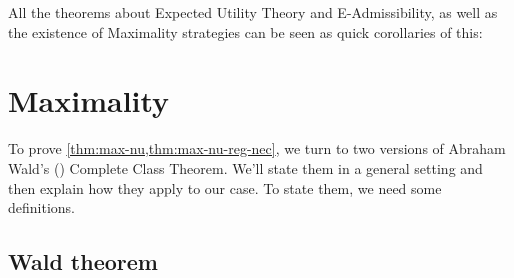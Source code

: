 \documentclass[a4paper]{article}
\newcommand\D{\mathcal{D}}
\newcommand\Exp{\mathsf{Exp}}
\newcommand\EU{\mathrm{EU}}
\newcommand\U{\mathfrak{U}} %
\newcommand{\pb}{b}
\newcommand\SetDelimiter[1][]{
	\nonscript\,#1\vert \allowbreak \nonscript\,\mathopen{}}
\providecommand\given{\SetDelimiter}
\renewcommand{\leq}{\leqslant}
\newenvironment{CCM rewritten}
{\begingroup\color{blue}} %
{\endgroup}              %
\begin{document}
All the theorems about Expected Utility Theory and E-Admissibility, as well as the existence of Maximality strategies can be seen as quick corollaries of this: 

\begin{comment}
	
In fact, we can create a version of this result allowing dependence between the decision problem you're faced with and the state of the world, assuming that when you make a decision you first conditionalise your probabilities on which decision problem you're faced with and then use expected utility using that updated probability to make the decision. 
This is because $\Exp_\pb[\U(\nu)]=\Exp_{\pb_\D}\Exp_{\pb(\cdot|D)}\U(\nu)$, where $\pb_\D$ is the marginal. Each $\Exp_{\pb(\cdot|D)}\U(\nu)$ is maximised when $\nu_D(\EU_{\pb(\cdot|D)}(D))=1$, at least, whenever this is well-defined. So, similarly, $\Exp_\pb[\U(\nu)]$  is maximised when $\pb_\D\{D\given \nu_D(\EU_{\pb(\cdot|D)}(D))=1\}=1$.
\end{comment}


\section{Maximality}
To prove \cref{thm:max-nu,thm:max-nu-reg-nec}, we turn to two versions of Abraham Wald's (\citeyear{wald1947cct}) Complete Class Theorem. We'll state them in a general setting and then explain how they apply to our case. To state them, we need some definitions.
\subsection{Wald theorem}
\end{document}
